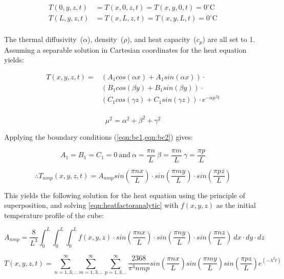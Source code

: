 \begin{align}
T(0,y,z,t)&=T(x,0,z,t)=T(x,y,0,t)=0^{\circ}\text{C} \label{eqn:bc1}\\
T(L,y,z,t)&=T(x,L,z,t)=T(x,y,L,t)=0^{\circ}\text{C} \label{eqn:bc2}\\
\end{align}

The thermal diffusivity~($\alpha$), density~($\rho$), and heat capacity~($c_p$) are all set to 1. Assuming a separable solution in Cartesian coordinates for the heat equation yields:

\begin{equation}
\begin{split}
T(x,y,z,t)=&(A_1 cos(\alpha x) + A_1 sin(\alpha x))\cdot\\
&(B_1 cos(\beta y) + B_1 sin(\beta y))\cdot\\
&(C_1 cos(\gamma z) + C_1 sin(\gamma z))\cdot e^{-\alpha\mu^2t}\\
\end{split} 
\end{equation}

\begin{equation}
\mu^2=\alpha^2+\beta^2+\gamma^2
\end{equation}

Applying the boundary conditions (\cref{eqn:bc1,eqn:bc2}) gives:

\begin{equation}
A_1=B_1=C_1=0\
\text{and}\ \alpha=\frac{\pi n}{L}\ \beta=\frac{\pi m}{L}\ \gamma=\frac{\pi p}{L}
\end{equation}

\begin{equation}
\therefore  T_{nmp}(x,y,z,t)=A_{nmp} sin\left(\frac{\pi n x}{L}\right)\cdot sin\left(\frac{\pi m y}{L}\right)\cdot sin\left(\frac{\pi p z}{L}\right)
\end{equation}

This yields the following solution for the heat equation using the principle of superposition, and solving \cref{eqn:heatfactoranalytic} with $f(x,y,z)$ as the initial temperature profile of the cube:

\begin{equation}
A_{nmp}=\frac{8}{L^3}\int_0^L\int_0^L\int_0^L f(x,y,z)\cdot sin(\frac{\pi n x}{L})\cdot sin(\frac{\pi n y}{L})\cdot sin(\frac{\pi n z}{L})\ dx\cdot dy\cdot dz
\label{eqn:heatfactoranalytic}
\end{equation}

\begin{equation}
T(x,y,z,t)=\sum^\infty_{n=1,3,..}\sum^\infty_{m=1,3,..}\sum^\infty_{p=1,3,..}\frac{2368}{\pi^3nmp} sin(\frac{\pi n x}{L}) sin(\frac{\pi m y}{L}) sin(\frac{\pi p z}{L})e^{(-\lambda^2t)}
\end{equation}

